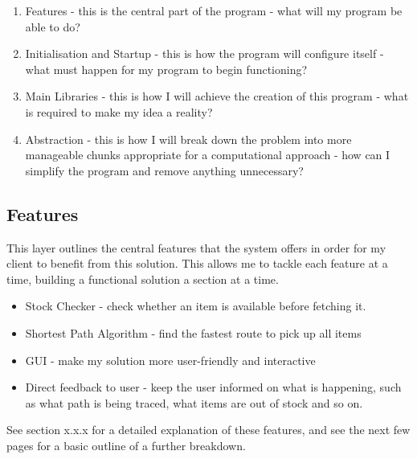 \begin{enumerate}
    \item Features - this is the central part of the program - what will my program be able to do?
    \item Initialisation and Startup - this is how the program will configure itself - what must happen for my program to begin functioning?
    \item Main Libraries - this is how I will achieve the creation of this program - what is required to make my idea a reality?
    \item Abstraction - this is how I will break down the problem into more manageable chunks appropriate for a computational approach - how can I simplify the program and remove anything unnecessary?
\end{enumerate}


\subsection{Features}
This layer outlines the central features that the system offers in order for my client to benefit from this solution. This allows me to tackle each feature at a time, building a functional solution a section at a time.


\begin{itemize}
    \item Stock Checker - check whether an item is available before fetching it.
    \item Shortest Path Algorithm - find the fastest route to pick up all items
    \item GUI - make my solution more user-friendly and interactive
    \item Direct feedback to user - keep the user informed on what is happening, such as what path is being traced, what items are out of stock and so on.
\end{itemize}

See section x.x.x for a detailed explanation of these features, and see the next few pages for a basic outline of a further breakdown.

\newpage

